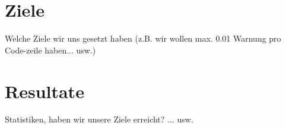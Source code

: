 \documentclass[qualitaetssicherung.tex]{subfiles}
\begin{document}
\section{Ziele}
Welche Ziele wir uns gesetzt haben (z.B. wir wollen max. 0.01 Warnung pro Code-zeile haben... usw.)

\section{Resultate}
Statistiken, haben wir unsere Ziele erreicht? ... usw.
\end{document}
